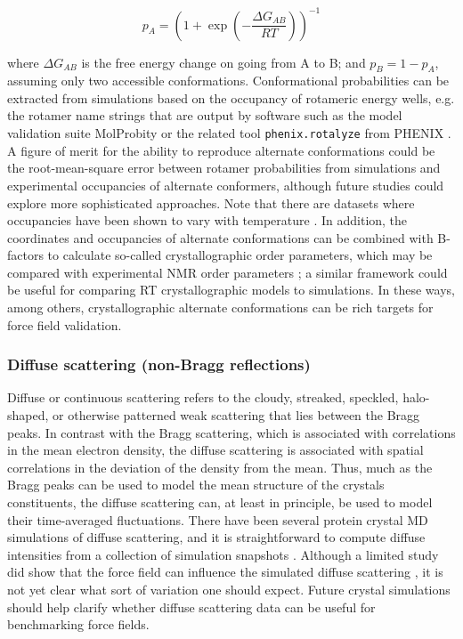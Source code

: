 \documentclass[9pt,review]{livecoms}
\begin{document}
\begin{equation}
\label{eqn:alt_confs}
p_A = \left( 1 + \exp \left(- \frac {\Delta G_{AB}} {R T} \right) \right )^{-1}
\end{equation}

\noindent where $\Delta G_{AB}$ is the free energy change on going from A to B; and $p_B = 1-p_A$, assuming only two accessible conformations.
Conformational probabilities can be extracted from simulations based on the occupancy of rotameric energy wells, e.g. the rotamer name strings \cite{lovell_penultimate_2000} that are output by software such as the model validation suite MolProbity \cite{williams_molprobity_2018} or the related tool \verb|phenix.rotalyze| from PHENIX \cite{liebschner_macromolecular_2019}.
A figure of merit for the ability to reproduce alternate conformations could be the root-mean-square error between rotamer probabilities from simulations and experimental occupancies of alternate conformers, although future studies could explore more sophisticated approaches.
Note that there are datasets where occupancies have been shown to vary with temperature \cite{cbradford_temperature_2021}.
In addition, the coordinates and occupancies of alternate conformations can be combined with B-factors to calculate so-called crystallographic order parameters, which may be compared with experimental NMR order parameters \cite{fenwick_integrated_2014}; a similar framework could be useful for comparing RT crystallographic models to simulations.
In these ways, among others, crystallographic alternate conformations can be rich targets for force field validation. 

\subsubsection{Diffuse scattering (non-Bragg reflections)}
\label{sub2:diffuse}

Diffuse or continuous scattering refers to the cloudy, streaked, speckled, halo-shaped, or otherwise patterned weak scattering that lies between the Bragg peaks.
In contrast with the Bragg scattering, which is associated with correlations in the mean electron density, the diffuse scattering is associated with spatial correlations in the deviation of the density from the mean.
Thus, much as the Bragg peaks can be used to model the mean structure of the crystals constituents, the diffuse scattering can, at least in principle, be used to model their time-averaged fluctuations.
There have been several protein crystal MD simulations of diffuse scattering, and it is straightforward to compute diffuse intensities from a collection of simulation snapshots \cite{faure_correlated_1994,clarage_sampling_1995,hery_x-ray_1998,meinhold_fluctuations_2005,wall_conformational_2014,wall_internal_2018,wych_liquid-like_2019,meisburger_diffuse_2020,meisburger_robust_2023}.
Although a limited study did show that the force field can influence the simulated diffuse scattering \cite{wych_liquid-like_2019}, it is not yet clear what sort of variation one should expect.
Future crystal simulations should help clarify whether diffuse scattering data can be useful for benchmarking force fields.
\end{document}
